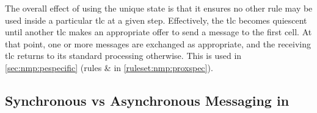 The overall effect of using the unique state is that it ensures no other rule may be used inside a particular \gls{tlc} at a given step.  Effectively, the \gls{tlc} becomes quiescent until another \gls{tlc} makes an appropriate offer to send a message to the first cell.  At that point, one or more messages are exchanged as appropriate, and the receiving \gls{tlc} returns to its standard processing otherwise.  This is used in \cref{sec:nmp:pespecific} (rules  \&  in \vref{ruleset:nmp:proxspec}).


\subsection{\label{sec:cps:syncasync}Synchronous vs Asynchronous Messaging in }


